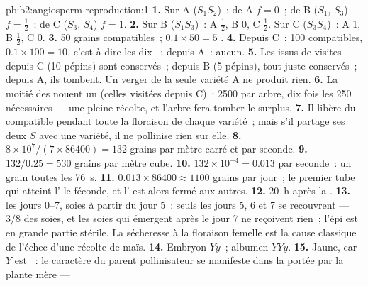 \begin{solution}{pb:b2:angiosperm-reproduction:1}
\textbf{1.} Sur A ($S_1S_2$)~:  de A $f = 0$~; de B ($S_1$, $S_3$)
$f =
\tfrac12$~; de C ($S_3$, $S_4$) $f = 1$.
\textbf{2.} Sur B ($S_1S_3$)~: A $\tfrac12$, B 0, C $\tfrac12$. Sur C
($S_3S_4$)~: A 1, B $\tfrac12$, C 0.
\textbf{3.} 50 grains compatibles~; $0.1\times 50 = 5$ .
\textbf{4.} Depuis C~: 100 compatibles, $0.1\times 100 = 10$,
c'est-à-dire les dix ~; depuis A~: aucun.
\textbf{5.} Les  issus de visites depuis C (10 pépins) sont
conservés~; depuis B (5 pépins), tout juste conservés~; depuis A, ils
tombent. Un verger de la seule variété A ne produit rien.
\textbf{6.} La moitié des  nouent un  (celles visitées depuis
C)~: 2500  par arbre, dix fois les 250 nécessaires --- une pleine
récolte, et l'arbre fera tomber le surplus.
\textbf{7.} Il libère du  compatible pendant toute la floraison de
chaque variété~; mais s'il partage ses deux  $S$ avec une
variété, il ne pollinise rien sur elle.
\textbf{8.} $8\times 10^{7}/(7\times 86400) = 132$ grains par mètre carré
et par seconde.
\textbf{9.} $132/0.25 = 530$ grains par mètre cube.
\textbf{10.} $132\times 10^{-4} = 0.013$ par seconde~: un grain toutes
les \qty{76}{s}.
\textbf{11.} $0.013\times 86400 \approx 1100$ grains par jour~; le
premier tube qui atteint l' le féconde, et l' est alors fermé
aux autres.
\textbf{12.} \qty{20}{h} après la .
\textbf{13.}  les jours 0--7, soies à partir du jour 5~: seuls les
jours 5, 6 et 7 se recouvrent --- $3/8$ des soies, et
les soies qui émergent après le jour 7 ne reçoivent rien~; l'épi est en
grande partie stérile. La sécheresse à la floraison femelle est la cause
classique de l'échec d'une récolte de maïs.
\textbf{14.} Embryon $Yy$~; albumen $YYy$.
\textbf{15.} Jaune, car $Y$ est ~: le caractère du parent
pollinisateur se manifeste dans la  portée par la plante mère ---

\end{solution}
